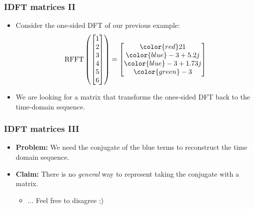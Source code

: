 \documentclass{beamer}
\begin{document}
\begin{frame}
\frametitle{IDFT matrices II}
\begin{itemize}
    \item Consider the one-sided DFT of our previous example:
        \begin{equation}
        \textrm{RFFT}\left(\begin{bmatrix}1 \\ 2 \\ 3 \\ 4 \\ 5 \\ 6 \end{bmatrix}\right) = 
        \begin{bmatrix}
           {\color{red}21} \\ {\color{blue}-3+5.2j} \\ {\color{blue}-3+1.73j} \\
           {\color{green}-3} 
        \end{bmatrix}
        \end{equation}
    \item We are looking for a matrix that transforms the ones-sided DFT back to the time-domain sequence.
\end{itemize}
\end{frame}

\begin{frame}
\frametitle{IDFT matrices III}
\begin{itemize}
    \item \textbf{Problem:} We need the conjugate of the blue terms to reconstruct the time domain sequence.
    \item \textbf{Claim:} There is no \textit{general} way to represent taking the conjugate with a matrix.
    \begin{itemize}
        \item ... Feel free to disagree ;)
    \end{itemize}
\end{itemize}
\end{frame}
\end{document}
